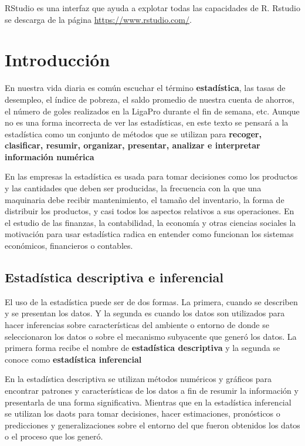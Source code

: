 \documentclass[]{book}
\begin{document}
RStudio es una interfaz que ayuda a explotar todas las capacidades de R.
Rstudio se descarga de la página \url{https://www.rstudio.com/}.

\chapter{Introducción}\label{intro}

En nuestra vida diaria es común escuchar el término
\textbf{estadística}, las tasas de desempleo, el índice de pobreza, el
saldo promedio de nuestra cuenta de ahorros, el número de goles
realizados en la LigaPro durante el fin de semana, etc. Aunque no es una
forma incorrecta de ver las estadísticas, en este texto se pensará a la
estadística como un conjunto de métodos que se utilizan para
\textbf{recoger, clasificar, resumir, organizar, presentar, analizar e
interpretar información numérica}

En las empresas la estadística es usada para tomar decisiones como los
productos y las cantidades que deben ser producidas, la frecuencia con
la que una maquinaria debe recibir mantenimiento, el tamaño del
inventario, la forma de distribuir los productos, y casi todos los
aspectos relativos a sus operaciones. En el estudio de las finanzas, la
contabilidad, la economía y otras ciencias sociales la motivación para
usar estadística radica en entender como funcionan los sistemas
económicos, financieros o contables.

\section{Estadística descriptiva e
inferencial}\label{estadistica-descriptiva-e-inferencial}

El uso de la estadística puede ser de dos formas. La primera, cuando se
describen y se presentan los datos. Y la segunda es cuando los datos son
utilizados para hacer inferencias sobre características del ambiente o
entorno de donde se seleccionaron los datos o sobre el mecanismo
subyacente que generó los datos. La primera forma recibe el nombre de
\textbf{estadística descriptiva} y la segunda se conoce como
\textbf{estadística inferencial}

En la estadística descriptiva se utilizan métodos numéricos y gráficos
para encontrar patrones y características de los datos a fin de resumir
la información y presentarla de una forma significativa. Mientras que en
la estadística inferencial se utilizan los daots para tomar decisiones,
hacer estimaciones, pronósticos o predicciones y generalizaciones sobre
el entorno del que fueron obtenidos los datos o el proceso que los
generó.
\end{document}
